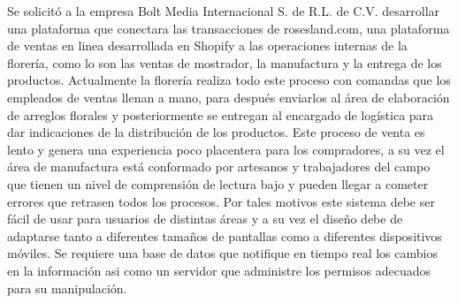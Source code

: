 Se solicitó a la empresa Bolt Media Internacional S. de R.L. de C.V. desarrollar una plataforma que conectara las transacciones de rosesland.com, una plataforma de ventas en linea desarrollada en Shopify a las operaciones internas de la florería, como lo son las ventas de mostrador, la manufactura y la entrega de los productos.
\vspace{0.8cm}
Actualmente la florería realiza todo este proceso con comandas que los empleados de ventas llenan a mano, para después enviarlos al área de elaboración de arreglos florales y posteriormente se entregan al encargado de logística para dar indicaciones de la distribución de los productos. Este proceso de venta es lento y genera una experiencia poco placentera para los compradores, a su vez el área de manufactura está conformado por artesanos y trabajadores del campo que tienen un nivel de comprensión de lectura bajo y pueden llegar a cometer errores que retrasen todos los procesos. Por tales motivos este sistema debe ser fácil de usar para usuarios de distintas áreas y a su vez el diseño debe de adaptarse tanto a diferentes tamaños de pantallas como a diferentes dispositivos móviles. Se requiere una base de datos que notifique en tiempo real los cambios
en la información asi como un servidor que administre los permisos adecuados para su manipulación.